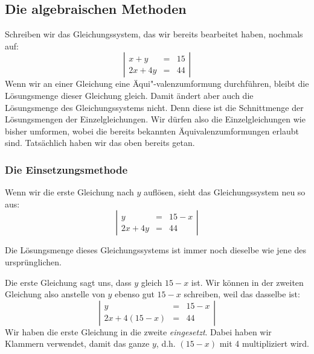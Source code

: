 \documentclass[%
11pt,%
twoside,%
titlepage,%
german,%
]{scrartcl}
\newenvironment{system}{\begin{displaymath}
  \left| 
    \begin{array}{rcl}}{\end{array} \right| 
\end{displaymath}}
\begin{document}
\subsection{Die algebraischen Methoden}
\label{linglsyst:algebraisch}

Schreiben wir das Gleichungssystem, das wir bereits bearbeitet haben, nochmals auf:
\begin{system}
  x+y & = & 15 \\
  2x+4y & = & 44
\end{system}Wenn wir an einer Gleichung eine \"Aqui"-valenzumformung durchf\"uhren, bleibt die L\"osungsmenge dieser Gleichung gleich. Damit \"andert aber auch die L\"osungsmenge des Gleichungssystems nicht. Denn diese ist die Schnittmenge der L\"osungsmengen der Einzelgleichungen. Wir d\"urfen also die Einzelgleichungen wie bisher umformen, wobei die bereits bekannten \"Aquivalenzumformungen erlaubt sind. Tats\"achlich haben wir das oben bereits getan.


\subsubsection{Die Einsetzungsmethode}
\label{linglsyst:algebraisch:einsetzung}

Wenn wir die erste Gleichung nach $y$ aufl\"osen, sieht das Gleichungssystem neu so aus:
\begin{system}
  y & = & 15-x \\
  2x+4y & = & 44
\end{system}

Die L\"osungsmenge dieses Gleichungssystems ist immer noch dieselbe wie jene des urspr\"unglichen. 

Die erste Gleichung sagt uns, dass $y$ gleich $15-x$ ist. Wir k\"onnen in der zweiten Gleichung also anstelle von $y$ ebenso gut $15-x$ schreiben, weil das dasselbe ist:
\begin{system}
  y & = & 15-x \\
  2x+4(15-x) & = & 44
\end{system}Wir haben die erste Gleichung in die zweite \emph{eingesetzt}. Dabei haben wir Klammern verwendet, damit das ganze $y$, d.h. $(15-x)$ mit 4 multipliziert wird.
\end{document}
